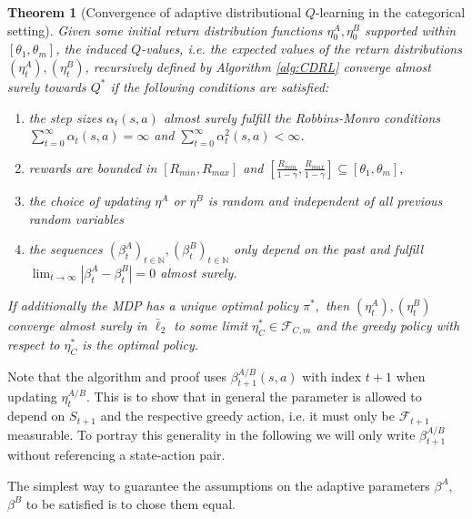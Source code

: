 \documentclass{article}
\newcommand{\cF}{\mathcal{F}}
\newcommand{\N}{\mathbb{N}}
\theoremstyle{plain}
\newtheorem{theorem}{Theorem}[section]
\theoremstyle{definition}
\theoremstyle{remark}
\begin{document}
\begin{theorem}[Convergence of adaptive distributional $Q$-learning in the categorical setting]\label{thm:double categorical control}
    Given some initial return distribution functions $\eta_0^{A},\eta^{B}_0$ supported within $[\theta_1,\theta_m]$, the induced $Q$-values, i.e. the expected values of the return distributions $(\eta_t^{A}),(\eta^{B}_t)$, recursively defined by Algorithm \ref{alg:CDRL} converge almost surely towards $Q^*$ if the following conditions are satisfied:
\begin{enumerate}
	\item the step sizes $\alpha_t(s,a)$ almost surely fulfill the Robbins-Monro conditions $\sum_{t=0}^{\infty}\alpha_t(s,a)=\infty$ and $
		\sum_{t=0}^{\infty}\alpha_t^{2}(s,a)<\infty$.
	\item rewards are bounded in $[R_{min},R_{max}]$ and $[\frac{R_{min}}{1-\gamma},\frac{R_{max}}{1-\gamma}]\subseteq[\theta_1,\theta_m],$
    \item the choice of updating $\eta^A$ or $\eta^B$ is random and independent of all  previous random variables 
    \item the sequences $(\beta^A_t)_{t\in\N},(\beta^B_t)_{t\in\N}$ only depend on the past and fulfill $\lim_{t\to\infty} |\beta^A_t-\beta^B_t|=0$ almost surely.
\end{enumerate}
If additionally the MDP has a unique optimal policy $\pi^*,$ then $(\eta_t^{A}),(\eta^{B}_t)$ converge almost surely in $\bar\ell_2$ to some limit $\eta^*_C\in\cF_{C,m}$ and the greedy policy with respect to $\eta^{*}_C$ is the optimal policy.
\end{theorem}

Note that the algorithm and proof uses $\beta^{A/B}_{t+1}(s,a)$ with index ${t+1}$ when updating $\eta^{A/B}_t$. This is to show that in general the parameter is allowed to depend on $S_{t+1}$ and the respective greedy action, i.e. it must only be $\cF_{t+1}$ measurable. To portray this generality in the following we will only write $\beta^{A/B}_{t+1}$ without referencing a state-action pair.

The simplest way to guarantee the assumptions on the adaptive parameters $\beta^A$, $\beta^B$ to be satisfied is to chose them equal.\smallskip
\end{document}
